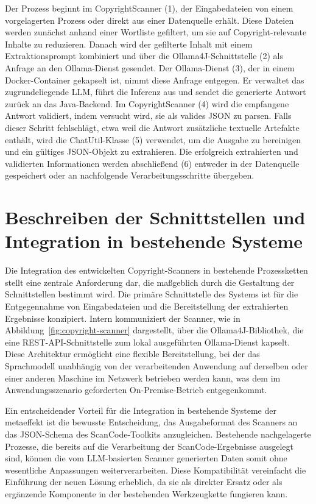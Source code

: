 Der Prozess beginnt im CopyrightScanner (1), der Eingabedateien von einem vorgelagerten Prozess oder direkt aus einer Datenquelle erhält.
Diese Dateien werden zunächst anhand einer Wortliste gefiltert, um sie auf Copyright-relevante Inhalte zu reduzieren.
Danach wird der gefilterte Inhalt mit einem Extraktionsprompt kombiniert und über die Ollama4J-Schnittstelle (2) als Anfrage an den Ollama-Dienst gesendet.
Der Ollama-Dienst (3), der in einem Docker-Container gekapselt ist, nimmt diese Anfrage entgegen.
Er verwaltet das zugrundeliegende LLM, führt die Inferenz aus und sendet die generierte Antwort zurück an das Java-Backend.
Im CopyrightScanner (4) wird die empfangene Antwort validiert, indem versucht wird, sie als valides JSON zu parsen.
Falls dieser Schritt fehlschlägt, etwa weil die Antwort zusätzliche textuelle Artefakte enthält, wird die ChatUtil-Klasse (5) verwendet, um die Ausgabe zu bereinigen und ein gültiges JSON-Objekt zu extrahieren.
Die erfolgreich extrahierten und validierten Informationen werden abschließend (6) entweder in der Datenquelle gespeichert oder an nachfolgende Verarbeitungsschritte übergeben.


\section{Beschreiben der Schnittstellen und Integration in bestehende Systeme}

Die Integration des entwickelten Copyright-Scanners in bestehende Prozessketten stellt eine zentrale Anforderung dar, die maßgeblich durch die Gestaltung der Schnittstellen bestimmt wird.
Die primäre Schnittstelle des Systems ist für die Entgegennahme von Eingabedateien und die Bereitstellung der extrahierten Ergebnisse konzipiert.
Intern kommuniziert der Scanner, wie in Abbildung~\ref{fig:copyright-scanner} dargestellt, über die Ollama4J-Bibliothek, die eine REST-API-Schnittstelle zum lokal ausgeführten Ollama-Dienst kapselt.
Diese Architektur ermöglicht eine flexible Bereitstellung, bei der das Sprachmodell unabhängig von der verarbeitenden Anwendung auf derselben oder einer anderen Maschine im Netzwerk betrieben werden kann, was dem im Anwendungsszenario geforderten On-Premise-Betrieb entgegenkommt.

Ein entscheidender Vorteil für die Integration in bestehende Systeme der metaeffekt ist die bewusste Entscheidung, das Ausgabeformat des Scanners an das JSON-Schema des ScanCode-Toolkits anzugleichen.
Bestehende nachgelagerte Prozesse, die bereits auf die Verarbeitung der ScanCode-Ergebnisse ausgelegt sind, können die vom LLM-basierten Scanner generierten Daten somit ohne wesentliche Anpassungen weiterverarbeiten.
Diese Kompatibilität vereinfacht die Einführung der neuen Lösung erheblich, da sie als direkter Ersatz oder als ergänzende Komponente in der bestehenden Werkzeugkette fungieren kann.

